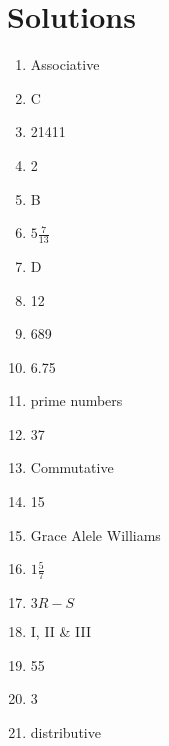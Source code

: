 \documentclass[../uilmath.tex]{subfiles}
\begin{document}
\section*{Solutions}
\begin{enumerate}[label=\bfseries\arabic*.]
    \item %
    Associative 

    \item %
    C  

    \item %
    21411

    \item %
    2

    \item %
    B 

    \item %
    $5 \frac{7}{13}$

    \item %
    D 

    \item %
    12 

    \item %
    689

    \item %
    6.75

    \item %
    prime numbers 

    \item %
    37

    \item %
    Commutative

    \item %
    15

    \item %
    Grace Alele Williams 

    \item %
    $1\frac{5}{7}$

    \item %
    $3R-S$

    \item %
    I, II \& III 

    \item %
    55

    \item %
    3

    \item %
    distributive 


\end{enumerate}
\end{document}
